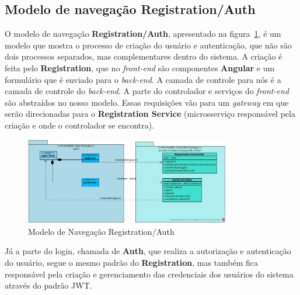 \subsection{Modelo de navegação Registration/Auth}

O modelo de navegação \textbf{Registration/Auth}, apresentado na figura~\ref{figura-arquitetura-nav-registration-auth}, é um modelo que mostra o processo de criação do usuário e autenticação, que não são dois processos separados, mas complementares dentro do sistema. A criação é feita pelo \textbf{Registration}, que no \textit{front-end} são componentes \textbf{Angular} e um formulário que é enviado para o \textit{back-end}. A camada de controle para nós é a camada de controle do \textit{back-end}. A parte do controlador e serviços do \textit{front-end} são abstraídos no nosso modelo. Essas requisições vão para um \textit{gateway} em que serão direcionadas para o \textbf{Registration Service} (microsserviço responsável pela criação e onde o controlador se encontra).

\begin{figure}[h]
	\centering
	\includegraphics[width=0.8\textwidth]{figuras/modelo-de-navegacao-registration-auth.jpg}
	\caption{Modelo de Navegação Registration/Auth}
	\label{figura-arquitetura-nav-registration-auth}
\end{figure}

Já a parte do login, chamada de \textbf{Auth}, que realiza a autorização e autenticação do usuário, segue o mesmo padrão do \textbf{Registration}, mas também fica responsável pela criação e gerenciamento das credenciais dos usuários do sistema através do padrão JWT.
